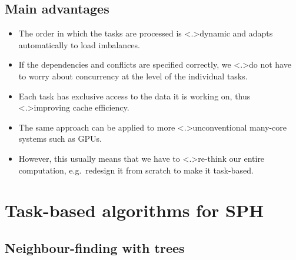 \documentclass{beamer}
\begin{document}
\begin{frame}
\begin{columns}
        \end{columns}
    \end{frame}
    
    
    \subsection{Main advantages}
    
    \begin{frame}
        \begin{itemize}
        
            \pause
            
            \item<+-> The order in which the tasks are processed is
                \alert<.>{dynamic} and
                adapts automatically to load imbalances.
                
            \item<+-> If the dependencies and conflicts are specified correctly,
                we \alert<.>{do not have to worry about concurrency} at the level
                of the individual tasks.
                
                    
            \item<+-> Each task has exclusive access to the data it
                is working on, thus \alert<.>{improving cache efficiency}.
            
            \item<+-> The same approach can be applied to more
                \alert<.>{unconventional many-core systems} such as GPUs.
            
            \item<+-> However, this usually means that
                we have to \alert<.>{re-think our entire computation},
                e.g.~redesign it from scratch to make it task-based.
                
        \end{itemize}
    \end{frame}
    
    
    \section{Task-based algorithms for SPH}
    \subsection{Neighbour-finding with trees}
    
\end{document}

